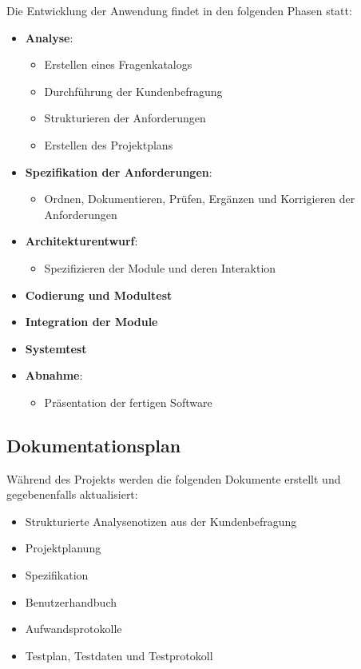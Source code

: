 \documentclass[11pt]{article}
\begin{document}
Die Entwicklung der Anwendung findet in den folgenden Phasen statt:
\begin{itemize}
	\item \textbf{Analyse}:
	\begin{itemize}
		\item Erstellen eines Fragenkatalogs
		\item Durchführung der Kundenbefragung
		\item Strukturieren der Anforderungen
		\item Erstellen des Projektplans
	\end{itemize}
	\item \textbf{Spezifikation der Anforderungen}:
	\begin{itemize}
		\item Ordnen, Dokumentieren, Prüfen, Ergänzen und Korrigieren der Anforderungen
	\end{itemize}
	\item \textbf{Architekturentwurf}:
	\begin{itemize}
		\item Spezifizieren der Module und deren Interaktion
	\end{itemize}
	\item \textbf{Codierung und Modultest}
	\item \textbf{Integration der Module}
	\item \textbf{Systemtest}
	\item \textbf{Abnahme}:
	\begin{itemize}
		\item Präsentation der fertigen Software
	\end{itemize}
\end{itemize}

\subsection{Dokumentationsplan}

Während des Projekts werden die folgenden Dokumente erstellt und gegebenenfalls aktualisiert:
\begin{itemize}
	\item Strukturierte Analysenotizen aus der Kundenbefragung
	\item Projektplanung
	\item Spezifikation
	\item Benutzerhandbuch
	\item Aufwandsprotokolle
	\item Testplan, Testdaten und Testprotokoll
\end{itemize}
\end{document}
